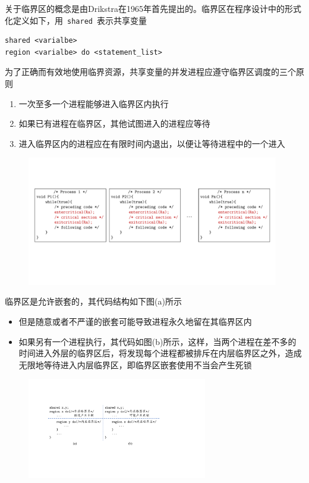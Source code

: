 \documentclass[cs4size,a4paper,10pt]{ctexart}
\begin{document}
	关于临界区的概念是由Drikstra在1965年首先提出的。临界区在程序设计中的形式化定义如下，用\, \verb|shared|\, 表示共享变量
	\begin{lstlisting}[keywordstyle=\color{black}]
shared <varialbe>
region <varialbe> do <statement_list>
	\end{lstlisting}
	为了正确而有效地使用临界资源，共享变量的并发进程应遵守临界区调度的三个原则
	\begin{enumerate}[label=\arabic*.]
		\item 一次至多一个进程能够进入临界区内执行
		\item 如果已有进程在临界区，其他试图进入的进程应等待
		\item 进入临界区内的进程应在有限时间内退出，以便让等待进程中的一个进入
	\end{enumerate}

	\begin{figure}[H]
		\centering
		\includegraphics[width=0.98\textwidth]{img/互斥与临界区.pdf}
	\end{figure}

	临界区是允许嵌套的，其代码结构如下图(a)所示
	\begin{itemize}
		\item 但是随意或者不严谨的嵌套可能导致进程永久地留在其临界区内
		\item 如果另有一个进程执行，其代码如图(b)所示，这样，当两个进程在差不多的时间进入外层的临界区后，将发现每个进程都被排斥在内层临界区之外，造成无限地等待进入内层临界区，即临界区嵌套使用不当会产生死锁
	\end{itemize}

	\begin{figure}[H]
		\centering
		\includegraphics[width=0.7\textwidth]{img/临界区嵌套使用.pdf}
	\end{figure}
\end{document}
